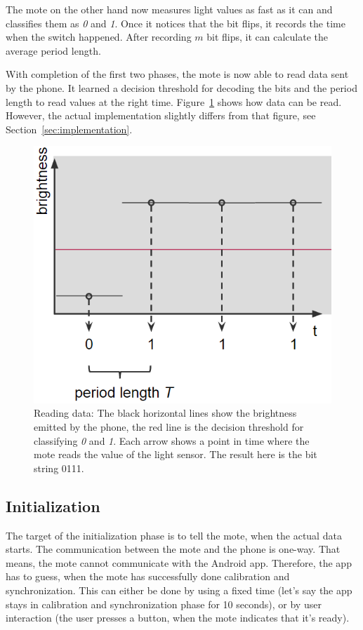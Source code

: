 \documentclass{sig-alternate} %
\begin{document}
The mote on the other hand now measures light values as fast as it can and classifies them as \textit{0} and \textit{1}.
Once it notices that the bit flips, it records the time when the switch happened.
After recording $m$ bit flips, it can calculate the average period length.

With completion of the first two phases, the mote is now able to read data sent by the phone.
It learned a decision threshold for decoding the bits and the period length to read values at the right time.
Figure~\ref{fig:read_a_bit} shows how data can be read.
However, the actual implementation slightly differs from that figure, see Section~\ref{sec:implementation}.

\begin{figure}
	\centering
	\includegraphics[scale=.5]{images/reading_data.png}
	\caption{Reading data: The black horizontal lines show the brightness emitted by the phone, the red line is the decision threshold for classifying \textit{0} and \textit{1}. Each arrow shows a point in time where the mote reads the value of the light sensor. The result here is the bit string 0111.}
	\label{fig:read_a_bit}
\end{figure}

\subsection{Initialization}
\label{sub:initialization}

The target of the initialization phase is to tell the mote, when the actual data starts.
The communication between the mote and the phone is one-way.
That means, the mote cannot communicate with the Android app.
Therefore, the app has to guess, when the mote has successfully done calibration and synchronization.
This can either be done by using a fixed time (let's say the app stays in calibration and synchronization phase for 10 seconds), or by user interaction (the user presses a button, when the mote indicates that it's ready).
\end{document}
